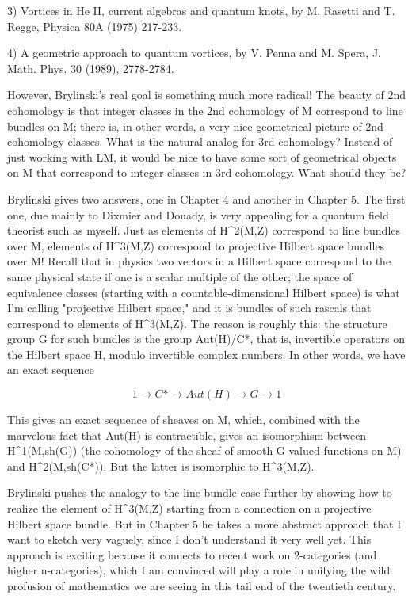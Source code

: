 3) Vortices in He II, current algebras and quantum knots, by M. Rasetti
and T. Regge, Physica 80A (1975) 217-233.

4) A geometric approach to quantum vortices, by V. Penna and M. Spera,
J. Math. Phys. 30 (1989), 2778-2784.  

However, Brylinski's real goal is something much more radical!  The
beauty of 2nd cohomology is that integer classes in the 2nd cohomology
of M correspond to line bundles on M; there is, in other words, a very
nice geometrical picture of 2nd cohomology classes.  What is the natural
analog for 3rd cohomology?  Instead of just working with LM, it would be
nice to have some sort of geometrical objects on M that correspond to
integer classes in 3rd cohomology.  What should they be?

Brylinski gives two answers, one in Chapter 4 and another in Chapter 5.
The first one, due mainly to Dixmier and Douady, is very appealing for
a quantum field theorist such as myself.  Just as elements of H^2(M,Z)
correspond to line bundles over M, elements of H^3(M,Z) correspond to
projective Hilbert space bundles over M!   Recall that in physics two
vectors in a Hilbert space correspond to the same physical state if one
is a scalar multiple of the other; the space of equivalence classes
(starting with a countable-dimensional Hilbert space) is what I'm
calling "projective Hilbert space," and it is bundles of such rascals
that correspond to elements of H^3(M,Z).  The reason is roughly this:
the structure group G for such bundles is the group Aut(H)/C*, that is,
invertible operators on the Hilbert space H, modulo invertible complex
numbers.  In other words, we have an exact sequence


$$

             1 \to  C* \to  Aut(H) \to  G \to  1
$$
    

This gives an exact sequence of sheaves on M, which, combined with the
marvelous fact that Aut(H) is contractible, gives an isomorphism between
H^1(M,sh(G)) (the cohomology of the sheaf of smooth G-valued functions
on M) and H^2(M,sh(C*)).  But the latter is isomorphic to H^3(M,Z).  

Brylinski pushes the analogy to the line bundle case further by showing
how to realize the element of H^3(M,Z) starting from a connection on a
projective Hilbert space bundle.  But in Chapter 5 he takes a more
abstract approach that I want to sketch very vaguely, since I don't
understand it very well yet.  This approach is exciting because it
connects to recent work on 2-categories (and higher n-categories), which
I am convinced will play a role in unifying the wild profusion of
mathematics we are seeing in this tail end of the twentieth century.  

